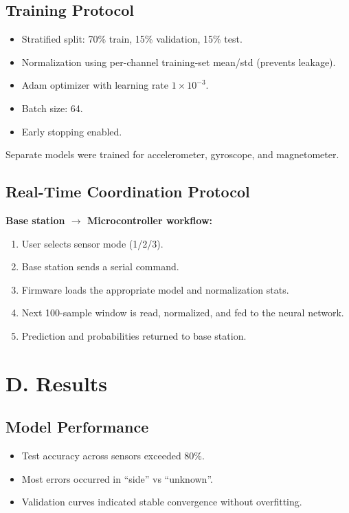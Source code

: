 \documentclass[12pt]{article}
\begin{document}
\subsection*{Training Protocol}
\begin{itemize}
    \item Stratified split: 70\% train, 15\% validation, 15\% test.
    \item Normalization using per-channel training-set mean/std (prevents leakage).
    \item Adam optimizer with learning rate $1\times10^{-3}$.
    \item Batch size: 64.
    \item Early stopping enabled.
\end{itemize}
Separate models were trained for accelerometer, gyroscope, and magnetometer.

\subsection*{Real-Time Coordination Protocol}

\textbf{Base station $\rightarrow$ Microcontroller workflow:}
\begin{enumerate}
    \item User selects sensor mode (1/2/3).
    \item Base station sends a serial command.
    \item Firmware loads the appropriate model and normalization stats.
    \item Next 100-sample window is read, normalized, and fed to the neural network.
    \item Prediction and probabilities returned to base station.
\end{enumerate}

\section*{D. Results}

\subsection*{Model Performance}
\begin{itemize}
    \item Test accuracy across sensors exceeded 80\%.
    \item Most errors occurred in ``side'' vs ``unknown''.
    \item Validation curves indicated stable convergence without overfitting.
\end{itemize}
\end{document}
